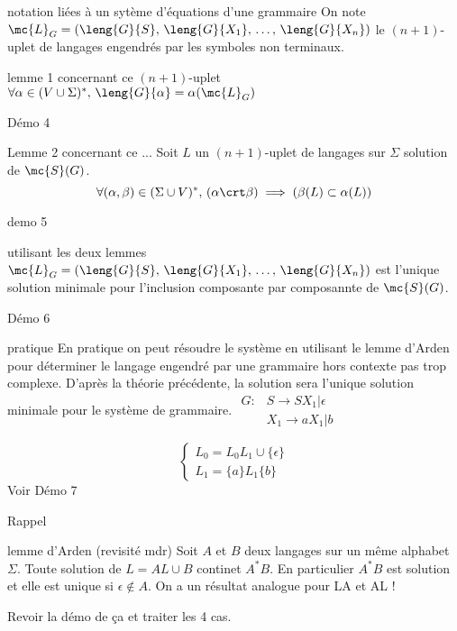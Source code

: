 \begin{adjustwidth}{-3cm}{-3cm}
\begin{remarque}{}{notation liées à un sytème d'équations d'une grammaire}
    On note $\mc{L}_G = (\leng{G}{S},\, \leng{G}{X_1},\,\dots,\,  \leng{G}{X_n})$ le $(n+1)$-uplet de langages engendrés par les symboles non terminaux.
\end{remarque}

\begin{proposition}{}{lemme 1 concernant ce $(n+1)$-uplet}
    $\forall \alpha \in (V \cup \Sigma)^*,\, \leng{G}{\alpha} = \alpha(\mc{L}_G)$
\end{proposition}
Démo 4

\begin{proposition}{}{Lemme 2 concernant ce ...}
    Soit $L$ un $(n+1)$-uplet de langages sur $\Sigma$ solution de $\mc{S}(G)$.\\
    $$\forall (\alpha,\beta) \in (\Sigma \cup V)^*,\, (\alpha \crt \beta) \implies (\beta(L) \subset \alpha(L))$$
\end{proposition}
demo 5

\begin{theoreme}{}{utilisant les deux lemmes}
    $\mc{L}_G = (\leng{G}{S},\, \leng{G}{X_1},\,\dots,\,  \leng{G}{X_n})$  est l'unique solution minimale pour l'inclusion composante par composannte de $\mc{S}(G)$.
\end{theoreme}
Démo 6

\begin{exemple}{}{pratique}
    En pratique on peut résoudre le système en utilisant le lemme d'Arden pour déterminer le langage engendré par une grammaire hors contexte pas trop complexe. D'après la théorie précédente, la solution sera l'unique solution minimale pour le système de grammaire.
    $\begin{align*}
        G : &S \rightarrow  SX_1 \vert \epsilon\\
        &X_1 \rightarrow aX_1 \vert b 
    \end{align*}$

    $$\begin{cases*}
        L_0 = L_0L_1 \cup \{\epsilon\}\\
        L_1 = \{a\}L_1\{b\}
    \end{cases*}$$
    Voir Démo 7
\end{exemple}

Rappel
\begin{theoreme}{}{lemme d'Arden (revisité mdr)}
    Soit $A$ et $B$ deux langages sur un même alphabet $\Sigma$. Toute solution de $L = AL\cup B$ continet $A^*B$. En particulier $A^*B$ est solution et elle est unique si $\epsilon \notin A$.
    On a un résultat analogue pour LA et AL !
\end{theoreme}
Revoir la démo de ça et traiter les 4 cas.


\end{adjustwidth}
